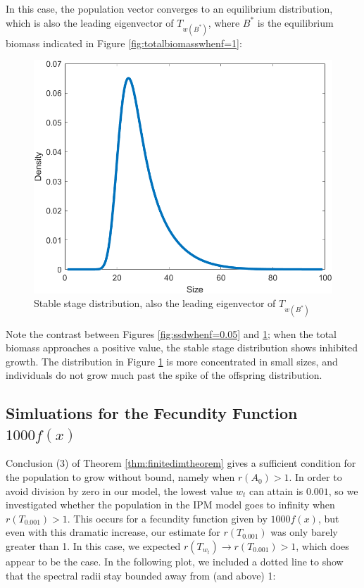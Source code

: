In this case, the population vector converges to an equilibrium distribution, which is also the leading eigenvector of $T_{w(B^*)}$, where $B^*$ is the equilibrium biomass indicated in Figure \ref{fig:totalbiomasswhenf=1}:

\begin{figure}[H]
	\centering
	\includegraphics[width=0.6\linewidth]{Images/F=1/ssd_when_f=1}
	\caption{Stable stage distribution, also the leading eigenvector of $T_{w(B^*)}$}
	\label{fig:ssdwhenf=1}
\end{figure}

Note the contrast between Figures \ref{fig:ssdwhenf=0.05} and \ref{fig:ssdwhenf=1}; when the total biomass approaches a positive value, the stable stage distribution shows inhibited growth. The distribution in Figure \ref{fig:ssdwhenf=1} is more concentrated in small sizes, and individuals do not grow much past the spike of the offspring distribution.

\subsection{Simluations for the Fecundity Function $1000f(x)$} \label{subsec:1000f(x)}

Conclusion (3) of Theorem \ref{thm:finitedimtheorem} gives a sufficient condition for the population to grow without bound, namely when $r(A_0) >1$. In order to avoid division by zero in our model, the lowest value $w_t$ can attain is $0.001$, so we investigated whether the population in the IPM model goes to infinity when $r(T_{0.001}) > 1$. This occurs for a fecundity function given by $1000f(x)$, but even with this dramatic increase, our estimate for $r(T_{0.001})$ was only barely greater than 1. In this case, we expected $r(T_{w_t}) \to r(T_{0.001}) > 1$, which does appear to be the case. In the following plot, we included a dotted line to show that the spectral radii stay bounded away from (and above) 1:

